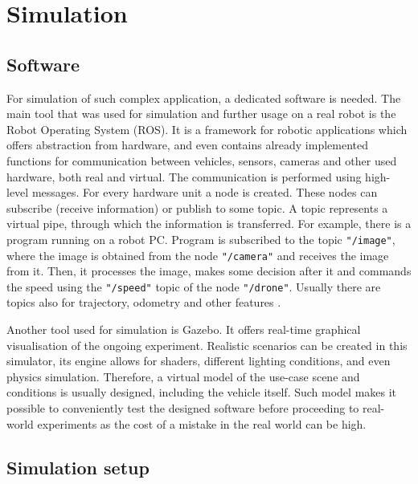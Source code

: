 \chapter{Simulation}



\section{Software}

For simulation of such complex application, a dedicated software is needed. The main tool that was used for simulation and further usage on a real robot is the Robot Operating System (\acs{ROS}). It is a framework for robotic applications which offers abstraction from hardware, and even contains already implemented functions for communication between vehicles, sensors, cameras and other used hardware, both real and virtual. 
The communication is performed using high-level messages. For every hardware unit a node is created. These nodes can subscribe (receive information) or publish to some topic. A topic represents a virtual pipe, through which the information is transferred. For example, there is a program running on a robot PC. Program is subscribed to the topic \texttt{"/image"}, where the image is obtained from the node \texttt{"/camera"} and receives the image from it. Then, it processes the image, makes some decision after it and commands the speed using the \texttt{"/speed"} topic of the node \texttt{"/drone"}. Usually there are topics also for trajectory, odometry and other features \cite{quigley2009ros}.

Another tool used for simulation is Gazebo. It offers real-time graphical visualisation of the ongoing experiment. Realistic scenarios can be created in this simulator, its engine allows for shaders, different lighting conditions, and even physics simulation. Therefore, a virtual model of the use-case scene and conditions is usually designed, including the vehicle itself. Such model makes it possible to conveniently test the designed software before proceeding to real-world experiments as the cost of a mistake in the real world can be high. 

\section{Simulation setup}

